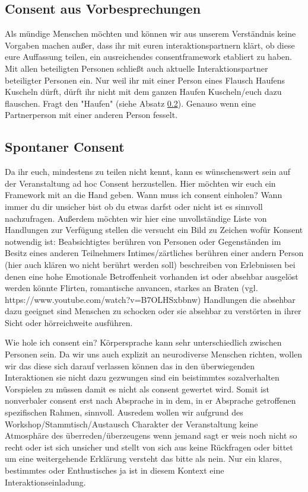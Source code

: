\documentclass{article}
\begin{document}
\subsection{Consent aus Vorbesprechungen}
Als mündige Menschen möchten und können wir aus unserem Verständnis keine Vorgaben machen außer, dass ihr mit euren interaktionspartnern klärt, ob diese eure Auffassung teilen, ein ausreichendes consentframework etabliert zu haben. Mit allen beteiligten Personen schließt auch aktuelle Interaktionspartner beteiligter Personen ein. Nur weil ihr mit einer Person eines Flausch Haufens Kuscheln dürft, dürft ihr nicht mit dem ganzen Haufen Kuscheln/euch dazu flauschen. Fragt den "Haufen" (siehe Absatz \ref{sponcon}). Genauso wenn eine Partnerperson mit einer anderen Person fesselt.
\subsection{Spontaner Consent}
\label{sponcon}
Da ihr euch, mindestens zu teilen nicht kennt, kann es wünschenswert sein auf der Veranstaltung ad hoc Consent herzustellen. Hier möchten wir euch ein Framework mit an die Hand geben. Wann muss ich consent einholen? Wann immer du dir unsicher bist ob du etwas darfst oder nicht ist es sinnvoll nachzufragen. Außerdem möchten wir hier eine unvollständige Liste von Handlungen zur Verfügung stellen die versucht ein Bild zu Zeichen wofür Konsent notwendig ist:
Beabsichtigtes berühren von Personen oder Gegenständen im Besitz eines anderen Teilnehmers Intimes/zärtliches berühren einer andern Person (hier auch klären wo nicht berührt werden soll) beschreiben von Erlebnissen bei denen eine hohe Emotionale Betroffenheit vorhanden ist oder absehbar ausgelöst werden könnte Flirten, romantische anvancen, starkes an Braten (vgl. https://www.youtube.com/watch?v=B7OLHSxbbnw) Handlungen die absehbar dazu geeignet sind Menschen zu schocken oder sie absehbar zu verstörten in ihrer Sicht oder hörreichweite ausführen.

Wie hole ich consent ein? Körpersprache kann sehr unterschiedlich zwischen Personen sein. Da wir uns auch explizit an neurodiverse Menschen richten, wollen wir das diese sich darauf verlassen können das in den überwiegenden Interaktionen sie nicht dazu gezwungen sind ein beistimmtes sozalverhalten Vorspielen zu müssen damit es nicht als consent gewertet wird. Somit ist nonverbaler consent erst nach Absprache in in dem, in er Absprache getroffenen spezifischen Rahmen, sinnvoll. Ausredem wollen wir aufgrund des Workshop/Stammtisch/Austausch Charakter der Veranstaltung keine Atmosphäre des überreden/überzeugens wenn jemand sagt er weis noch nicht so recht oder ist sich unsicher und stellt von sich aus keine Rückfragen oder bittet um eine weitergehende Erklärung versteht das bitte als nein. Nur ein klares, bestimmtes oder Enthustisches ja ist in diesem Kontext eine Interaktionseinladung.
\end{document}
